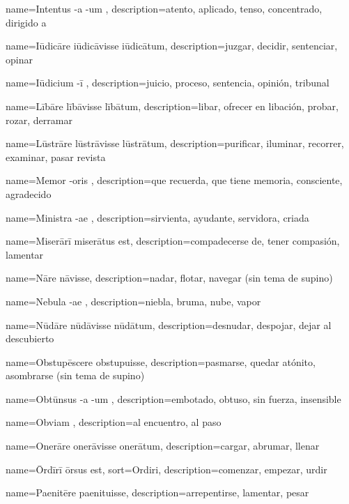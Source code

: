 {name={Intentus -a -um },
description={atento, aplicado, tenso, concentrado, dirigido a}}

{name={Iūdicāre iūdicāvisse iūdicātum},
description={juzgar, decidir, sentenciar, opinar}}

{name={Iūdicium -ī },
description={juicio, proceso, sentencia, opinión, tribunal}}

{name={Lībāre lībāvisse lībātum},
description={libar, ofrecer en libación, probar, rozar, derramar}}

{name={Lūstrāre lūstrāvisse lūstrātum},
description={purificar, iluminar, recorrer, examinar, pasar revista}}

{name={Memor -oris },
description={que recuerda, que tiene memoria, consciente, agradecido}}

{name={Ministra -ae },
description={sirvienta, ayudante, servidora, criada}}

{name={Miserārī miserātus est},
description={compadecerse de, tener compasión, lamentar}}

{name={Nāre nāvisse},
description={nadar, flotar, navegar (sin tema de supino)}}

{name={Nebula -ae },
description={niebla, bruma, nube, vapor}}

{name={Nūdāre nūdāvisse nūdātum},
description={desnudar, despojar, dejar al descubierto}}

{name={Obstupēscere obstupuisse},
description={pasmarse, quedar atónito, asombrarse (sin tema de supino)}}

{name={Obtūnsus -a -um },
description={embotado, obtuso, sin fuerza, insensible}}

{name={Obviam },
description={al encuentro, al paso}}

{name={Onerāre onerāvisse onerātum},
description={cargar, abrumar, llenar}}

{name={\=Ordīrī ōrsus est},
sort={Ordiri},
description={comenzar, empezar, urdir}}

{name={Paenitēre paenituisse},
description={arrepentirse, lamentar, pesar}}

